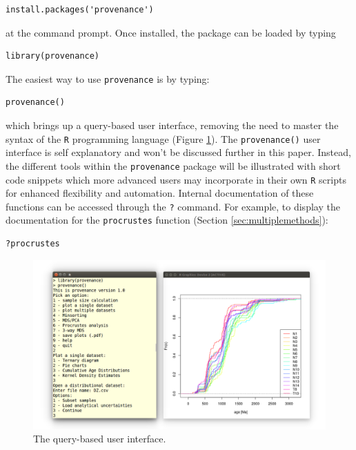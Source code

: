 \documentclass{article}
\begin{document}
\begin{verbatim}
install.packages('provenance')
\end{verbatim}

at the command prompt. Once installed, the package can be loaded by
typing

\begin{verbatim}
library(provenance)
\end{verbatim}

The easiest way to use {\tt provenance} is by typing:

\begin{verbatim}
provenance()
\end{verbatim}

which brings up a query-based user interface, removing the need to
master the syntax of the {\tt R} programming language (Figure
\ref{fig:gui}). The {\tt provenance()} user interface is self
explanatory and won't be discussed further in this paper.  Instead,
the different tools within the {\tt provenance} package will be
illustrated with short code snippets which more advanced users may
incorporate in their own {\tt R} scripts for enhanced flexibility and
automation. Internal documentation of these functions can be accessed
through the {\tt ?}  command.  For example, to display the
documentation for the {\tt procrustes} function (Section
\ref{sec:multiplemethods}):

\begin{verbatim}
?procrustes
\end{verbatim}

\begin{figure}
\centering
\includegraphics[width=\textwidth]{gui.png}
\caption{The query-based user interface.}
\label{fig:gui}
\end{figure}
\end{document}
